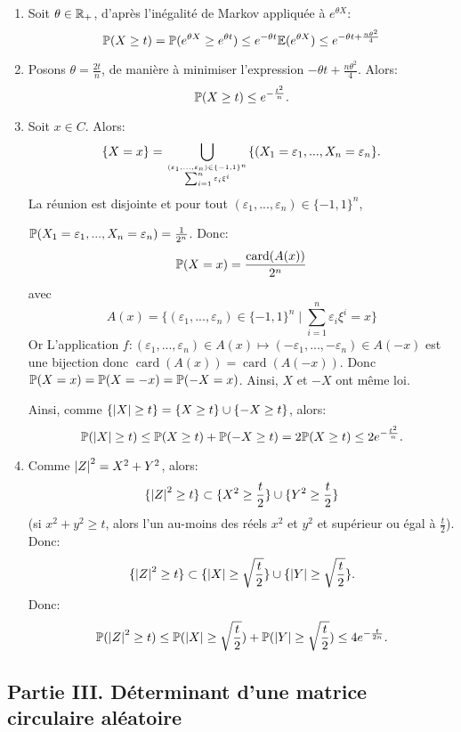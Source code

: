 \begin{enumerate}
\begin{enumerate}
  \end{enumerate}

  \item Soit $\theta\in \mathbb{R}_{+}$, d'après l'inégalité de Markov appliquée à $e^{\theta X}$:
  \[ \mathbb{P}(X\geq t) = \mathbb{P}(e^{\theta X} \geq e^{\theta t}) \leq e^{-\theta t}\mathbb{E}(e^{\theta X}) \leq e^{-\theta t + \frac{n\theta^{2}}{4}}\]
  
  \item Posons $\theta = \frac{2t}{n}$, de manière à minimiser l'expression $-\theta t + \frac{n\theta^{2}}{4}$. Alors:
  \[ \mathbb{P}(X\geq t) \leq e^{-\frac{t^{2}}{n}}.\]
  
  \item Soit $x\in C$. Alors:
  \[ \{ X = x\} = \bigcup_{(\varepsilon_{1}, ..., \varepsilon_{n})\in \{ -1, 1\}^{n}\atop \sum_{i=1}^{n}\varepsilon_{i}\xi^{i}}\{ (X_{1} = \varepsilon_{1}, ..., X_{n} = \varepsilon_{n} \}.\]
  La réunion est disjointe et pour tout $(\varepsilon_{1}, ..., \varepsilon_{n})\in \{ -1, 1\}^{n}$, 
  
  $\mathbb{P}(X_{1} = \varepsilon_{1}, ..., X_{n} = \varepsilon_{n}) = \frac{1}{2^{n}}$. Donc:
  \[ \mathbb{P}(X = x) = \frac{\operatorname{card}(A(x))}{2^{n}}\]
  avec 
  \[A(x) = \{ (\varepsilon_{1}, ..., \varepsilon_{n})\in \{ -1, 1\}^{n} \mid \sum_{i=1}^{n}\varepsilon_{i}\xi^{i}=x \}\]
  Or L'application $f:(\varepsilon_{1}, ..., \varepsilon_{n})\in A(x) \mapsto (-\varepsilon_{1}, ..., -\varepsilon_{n})\in A(-x)$ est une bijection donc $\operatorname{card}(A(x)) = \operatorname{card}(A(-x))$.
  Donc $\mathbb{P}(X = x) = \mathbb{P}(X = -x) = \mathbb{P}(-X = x)$. Ainsi, $X$ et $-X$ ont même loi.
  
  
Ainsi, comme $\{ \left\vert X\right\vert \geq t \} = \{ X \geq t \} \cup \{ -X \geq t\}$, alors:
\[ \mathbb{P}(\left\vert X\right\vert \geq t) \leq \mathbb{P}(X\geq t) + \mathbb{P}(-X \geq t) = 2\mathbb{P}(X\geq t)\leq 2e^{-\frac{t^{2}}{n}}.\]

\item Comme $\left\vert Z\right\vert^{2} = X^{2} + Y^{2}$, alors:
\[\{ \left\vert Z\right\vert^{2} \geq t\} \subset \{ X^{2} \geq \frac{t}{2} \} \cup \{ Y^{2}\geq \frac{t}{2}\}\]
(si $x^{2} + y^{2} \geq t$, alors l'un au-moins des réels $x^{2}$ et $y^{2}$ et supérieur ou égal à $\frac{t}{2}$). Donc:
\[ \{\left\vert Z\right\vert^{2} \geq t \} \subset \{ \left\vert X\right\vert \geq \sqrt{\frac{t}{2}} \} \cup \{ \left\vert Y\right\vert \geq \sqrt{\frac{t}{2}} \}.\]
Donc:
\[ \mathbb{P}(\left\vert Z\right\vert^{2}\geq t) \leq \mathbb{P}(\left\vert X\right\vert \geq \sqrt{\frac{t}{2}}) + \mathbb{P}(\left\vert Y\right\vert \geq \sqrt{\frac{t}{2}}) \leq 4e^{-\frac{t}{2n}}.\]
\end{enumerate}

\subsection*{Partie III. Déterminant d'une matrice circulaire aléatoire}

